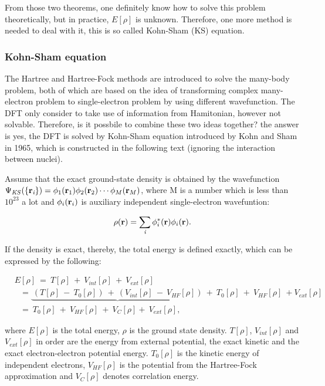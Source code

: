 \documentclass[a4paper, 12pt, titlepage,oneside,drop]{kthesis}
\begin{document}
From those two theorems, one definitely know how to solve this problem theoretically, but in practice, $E[\rho]$ is unknown. 
Therefore, one more method is needed to deal with it, this is so called Kohn-Sham (KS) equation.

\subsubsection{Kohn-Sham equation}

The Hartree and Hartree-Fock methods are introduced to solve the many-body problem, both of which are based on the idea of transforming complex 
many-electron problem to single-electron problem by using different wavefunction. The DFT only consider to take use of information from Hamitonian, however not solvable. 
Therefore, is it possbile to combine these two ideas together? the answer is yes, the DFT is solved by Kohn-Sham equation introduced by Kohn and Sham in 1965,
which is constructed in the following text (ignoring the interaction between nuclei).

Assume that the exact ground-state density is obtained by the wavefunction $\wfks = \bwf<1><1> \bwf<2><2> \cdots \bwf<M><M>$, where M is a number which is 
less than $10^{23}$ a lot and $\bwf<i><i>$ is auxiliary independent single-electron wavefuntion:

\begin{equation}\label{ks1}
 \rho(\textbf{r}) = \sumi<i> {\phi^{*}_{i}(\textbf{r})} {\phi_{i}(\textbf{r})}.
\end{equation}

If the density is exact, thereby, the total energy is defined exactly, which can be expressed by the following:

\begin{equation}\label{kse}
\begin{split}
&E[\rho] \ =\ T[\rho] \ + \ V_\textit{int}[\rho] \ + \ V_\textit{ext}[\rho]  \\
&\ \ \   = \underbrace{\ (T[\rho] \ - \ T_{0}[\rho]) \ + \  (V_\textit{int}[\rho] \ - \ V_\textit{HF}[\rho])\ }+ \ T_{0}[\rho] \ + \ V_\textit{HF}[\rho] \ + V_\textit{ext}[\rho]       \\
&\ \ \   = \ T_{0}[\rho] \ + \ V_\textit{HF}[\rho] \ + \ V_\textit{C}[\rho] +\ V_\textit{ext}[\rho],
\end{split}
\end{equation}

where $E[\rho]$  is the total energy, $\rho$ is the ground state density. $T[\rho]$, $V_\textit{int}[\rho]$ and $V_\textit{ext}[\rho]$ in order are the energy from external potential, the exact kinetic 
and the exact electron-electron potential energy. $T_{0}[\rho]$ is the kinetic energy of independent electrons, $V_\textit{HF}[\rho]$ is the potential from the Hartree-Fock approximation and $V_\textit{C}[\rho]$
denotes correlation energy.
\end{document}
